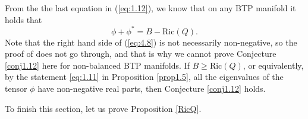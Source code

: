\documentclass{amsart}
\numberwithin{equation}{section}
\theoremstyle{definition}
\renewcommand{\1}{\mathds{1}}
\renewcommand{\>}{\rightarrow}
\begin{document}
From the the last equation in (\ref{eq:1.12}), we know that on any BTP manifold it holds that
\begin{equation}
\phi + \phi^{\ast} = B -\mbox{Ric}(Q). \label{eq:4.8}
\end{equation}
Note that the right hand side of (\ref{eq:4.8}) is not necessarily non-negative, so the proof of \cite[the proof of Theorem 3]{ZhaoZ19Str} does not go through,
and that is why we cannot prove Conjecture \ref{conj1.12} here for non-balanced BTP manifolds.
If $B \geq \mbox{Ric}(Q)$, or equivalently, by the statement \eqref{eq:1.11} in Proposition \ref{prop1.5},
all the eigenvalues of the tensor $\phi$ have non-negative real parts, then Conjecture \ref{conj1.12} holds.

To finish this section, let us prove Proposition \ref{RicQ}.
\end{document}
